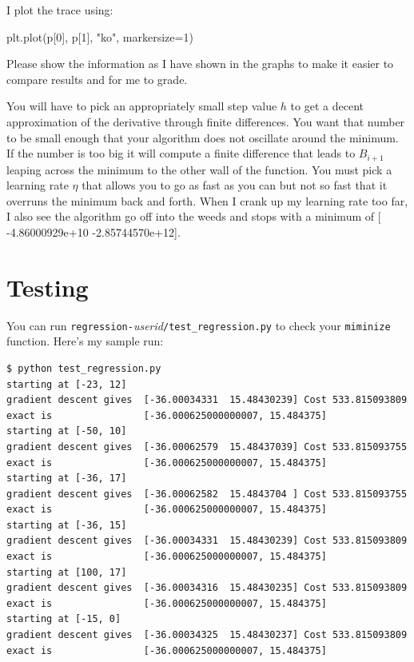 \documentclass[titlepage]{tufte-book}
\begin{document}
\begin{fullwidth}
\noindent I plot the trace using:

\begin{pyverbatim}
plt.plot(p[0], p[1], "ko", markersize=1)
\end{pyverbatim}

Please show the information as I have shown in the graphs to make it easier to compare results and for me to grade. 

You will have to pick an appropriately small step value $h$ to get a decent approximation of the derivative through finite differences. You want that number to be small enough that your algorithm does not oscillate around the minimum. If the number is too big it will compute a finite difference that leads to $B_{i+1}$ leaping across the minimum to the other wall of the function. You must pick a learning rate $\eta$ that allows you to go as fast as you can but not so fast that it overruns the minimum back and forth. When I crank up my learning rate too far, I also see the algorithm go off into the weeds and stops with a minimum of [ -4.86000929e+10  -2.85744570e+12].

\section{Testing}

You can run {\tt regression-}{\em userid}{\tt /test\_regression.py} to check your {\tt miminize} function.  Here's my sample run:

\begin{lstlisting}[style=BashInputStyle]
$ python test_regression.py
starting at [-23, 12]
gradient descent gives  [-36.00034331  15.48430239] Cost 533.815093809
exact is                [-36.000625000000007, 15.484375]
starting at [-50, 10]
gradient descent gives  [-36.00062579  15.48437039] Cost 533.815093755
exact is                [-36.000625000000007, 15.484375]
starting at [-36, 17]
gradient descent gives  [-36.00062582  15.4843704 ] Cost 533.815093755
exact is                [-36.000625000000007, 15.484375]
starting at [-36, 15]
gradient descent gives  [-36.00034331  15.48430239] Cost 533.815093809
exact is                [-36.000625000000007, 15.484375]
starting at [100, 17]
gradient descent gives  [-36.00034316  15.48430235] Cost 533.815093809
exact is                [-36.000625000000007, 15.484375]
starting at [-15, 0]
gradient descent gives  [-36.00034325  15.48430237] Cost 533.815093809
exact is                [-36.000625000000007, 15.484375]
\end{lstlisting}


\end{fullwidth}
\end{document}
